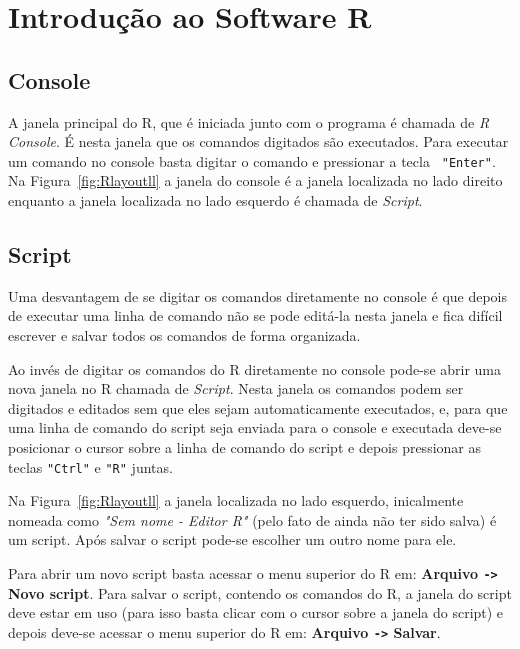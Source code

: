 \documentclass[11pt,fleqn]{book} %
\begin{document}
\chapter{Introdução ao Software R}


\section{Console}

A janela principal do R, que é iniciada junto com o programa é chamada de {\itshape R Console}. É nesta janela que os comandos digitados são executados. Para executar um comando no console basta digitar o comando e pressionar a tecla \texttt{ "Enter"}. Na Figura~\ref{fig:Rlayoutll} a janela do console é a janela localizada no lado direito enquanto a janela localizada no lado esquerdo é chamada de {\itshape Script}.


\section{Script}

Uma desvantagem de se digitar os comandos diretamente no console é que depois de executar uma linha de comando não se pode editá-la nesta janela e fica difícil escrever e salvar todos os comandos de forma organizada. 

Ao invés de digitar os comandos do R diretamente no console pode-se abrir uma nova janela no R chamada de {\itshape Script}. Nesta janela os comandos podem ser digitados e editados sem que eles sejam automaticamente executados, e, para que uma linha de comando do script seja enviada para o console e executada deve-se posicionar o cursor sobre a linha de comando do script e depois pressionar as teclas \texttt{"Ctrl"} e \texttt{"R"} juntas. 

Na Figura~\ref{fig:Rlayoutll} a janela localizada no lado esquerdo, inicalmente nomeada como {\itshape "Sem nome - Editor R"} (pelo fato de ainda não ter sido salva) é um script. Após salvar o script pode-se escolher um outro nome para ele.

Para abrir um novo script basta acessar o menu superior do R em: {\bf Arquivo \texttt{->} Novo script}. Para salvar o script, contendo os comandos do R, a janela do script deve estar em uso (para isso basta clicar com o cursor sobre a janela do script) e depois deve-se acessar o menu superior do R em: {\bf Arquivo \texttt{->} Salvar}.
\end{document}
